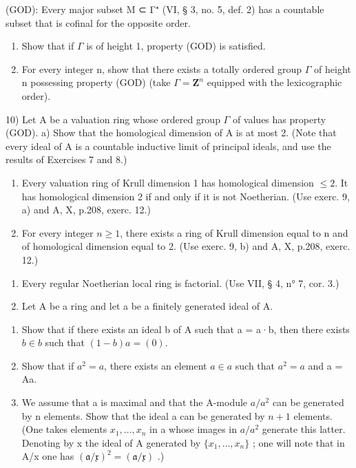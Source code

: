 (GOD): Every major subset M ⊂ Γ⁺ (VI, § 3, no. 5, def. 2) has a countable subset that is cofinal for the opposite order.

\begin{enumerate}
\def\labelenumi{\alph{enumi})}
\item
  Show that if \(\Gamma\) is of height 1, property (GOD) is satisfied.
\item
  For every integer n, show that there exists a totally ordered group \(\Gamma\) of height n possessing property (GOD) (take \(\Gamma = \mathbf{Z}^{n}\) equipped with the lexicographic order).
\end{enumerate}

10) Let A be a valuation ring whose ordered group \(\Gamma\) of values has property (GOD). a) Show that the homological dimension of A is at most 2. (Note that every ideal of A is a countable inductive limit of principal ideals, and use the results of Exercises 7 and 8.)

\begin{enumerate}
\def\labelenumi{\alph{enumi})}
\setcounter{enumi}{1}
\item
  Every valuation ring of Krull dimension 1 has homological dimension \(\leqslant 2\). It has homological dimension 2 if and only if it is not Noetherian. (Use exerc. 9, a) and A, X, p.208, exerc. 12.)
\item
  For every integer \(n \geqslant 1\), there exists a ring of Krull dimension equal to n and of homological dimension equal to 2. (Use exerc. 9, b) and A, X, p.208, exerc. 12.)
\end{enumerate}

\begin{enumerate}
\def\labelenumi{\arabic{enumi})}
\setcounter{enumi}{10}
\item
  Every regular Noetherian local ring is factorial. (Use VII, § 4, n° 7, cor. 3.)
\item
  Let A be a ring and let a be a finitely generated ideal of A.
\end{enumerate}

\begin{enumerate}
\def\labelenumi{\alph{enumi})}
\item
  Show that if there exists an ideal b of A such that a = a·b, then there exists \(b \in b\) such that \((1 - b)a = (0)\).
\item
  Show that if \(a^{2} = a\), there exists an element \(a \in a\) such that \(a^{2} = a\) and a = Aa.
\item
  We assume that a is maximal and that the A-module \(a/a^{2}\) can be generated by n elements. Show that the ideal a can be generated by \(n + 1\) elements. (One takes elements \(x_{1}, \ldots, x_{n}\) in a whose images in \(a/a^{2}\) generate this latter. Denoting by x the ideal of A generated by \(\{x_{1}, \ldots, x_{n}\}\) ; one will note that in A/x one has \((\mathfrak{a}/\mathfrak{x})^{2} = (\mathfrak{a}/\mathfrak{x})\) .)
\end{enumerate}

